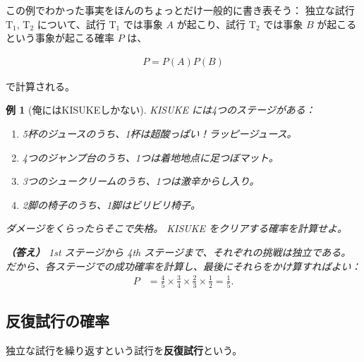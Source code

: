 \documentclass[12pt]{ltjsarticle}\usepackage{ifthen}\newcounter{enlarge}\setcounter{enlarge}{1}
\newtheorem{eg}{例}
\begin{document}
この例でわかった事実をほんのちょっとだけ一般的に書き表そう：
独立な試行 $\mathrm{T}_1,\, \mathrm{T}_2$ について、試行 $\mathrm{T}_1$ では事象 $A$ が起こり、試行 $\mathrm{T}_2$ では事象 $B$ が起こるという事象が起こる確率 $P$ は、
\begin{oframed}
  \begin{align}
     P = P(A)P(B) \label{eq:2.10}
  \end{align}
\end{oframed}
\noindent
で計算される。

\begin{eg}[俺にはKISUKEしかない]
  KISUKE には4つのステージがある：
  \begin{enumerate}
  \item 5杯のジュースのうち、1杯は超酸っぱい！ラッピージュース。
  \item 4つのジャンプ台のうち、1つは着地地点に足つぼマット。
  \item 3つのシュークリームのうち、1つは激辛からし入り。
  \item 2脚の椅子のうち、1脚はビリビリ椅子。
  \end{enumerate}
  ダメージをくらったらそこで失格。
  KISUKE をクリアする確率を計算せよ。

  \textbf{（答え）}
  1st ステージから 4th ステージまで、それぞれの挑戦は独立である。
  だから、各ステージでの成功確率を計算し、最後にそれらをかけ算すればよい：
  \begin{align}
    P &= \frac{4}{5} \times \frac{3}{4} \times \frac{2}{3} \times \frac{1}{2} =\frac{1}{5}.
  \end{align}
\end{eg}

\subsection{反復試行の確率}

独立な試行を繰り返すという試行を\textbf{反復試行}という。
\end{document}
